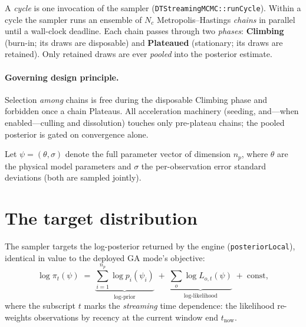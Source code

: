 \documentclass[11pt]{article}
\newcommand{\code}[1]{\texttt{\small #1}}
\begin{document}
A \emph{cycle} is one invocation of the sampler
(\code{DTStreamingMCMC::runCycle}). Within a cycle the sampler runs an
ensemble of $N_c$ Metropolis--Hastings \emph{chains} in parallel until a
wall-clock deadline. Each chain passes through two \emph{phases}:
\textbf{Climbing} (burn-in; its draws are disposable) and
\textbf{Plateaued} (stationary; its draws are retained). Only retained
draws are ever \emph{pooled} into the posterior estimate.

\paragraph{Governing design principle.} Selection \emph{among} chains is
free during the disposable Climbing phase and forbidden once a chain
Plateaus. All acceleration machinery (seeding, and---when
enabled---culling and dissolution) touches only pre-plateau chains; the
pooled posterior is gated on convergence alone.

Let $\psi=(\theta,\sigma)$ denote the full parameter vector of dimension
$n_p$, where $\theta$ are the physical model parameters and $\sigma$ the
per-observation error standard deviations (both are sampled jointly).

\section{The target distribution}\label{sec:target}

The sampler targets the log-posterior returned by the engine
(\code{posteriorLocal}), identical in value to the deployed GA mode's
objective:
\begin{equation}
  \log \pi_t(\psi) \;=\; \underbrace{\sum_{i=1}^{n_p}\log
  p_i(\psi_i)}_{\text{log-prior}}
  \;+\; \underbrace{\sum_{o}\log L_{o,t}(\psi)}_{\text{log-likelihood}}
  \;+\; \text{const},
\end{equation}
where the subscript $t$ marks the \emph{streaming} time dependence: the
likelihood re-weights observations by recency at the current window end
$t_{\text{now}}$.
\end{document}
